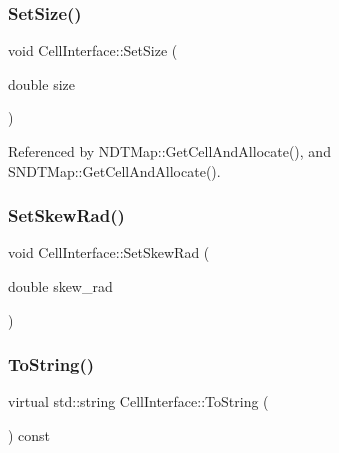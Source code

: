 \mbox{\label{classCellInterface_a100dd6525d41dc526848a5f0e96052d4}} 
\subsubsection{\texorpdfstring{Set\+Size()}{SetSize()}}
{\footnotesize\ttfamily void Cell\+Interface\+::\+Set\+Size (\begin{DoxyParamCaption}\item[{double}]{size }\end{DoxyParamCaption})\hspace{0.3cm}{\ttfamily [inline]}}



Referenced by N\+D\+T\+Map\+::\+Get\+Cell\+And\+Allocate(), and S\+N\+D\+T\+Map\+::\+Get\+Cell\+And\+Allocate().

\mbox{\label{classCellInterface_a2dd7e0d29d71fa86b9abb188a77fdf03}} 
\subsubsection{\texorpdfstring{Set\+Skew\+Rad()}{SetSkewRad()}}
{\footnotesize\ttfamily void Cell\+Interface\+::\+Set\+Skew\+Rad (\begin{DoxyParamCaption}\item[{double}]{skew\+\_\+rad }\end{DoxyParamCaption})\hspace{0.3cm}{\ttfamily [inline]}}

\mbox{\label{classCellInterface_aaf0e64422724ac733741783a4323a4c2}} 
\subsubsection{\texorpdfstring{To\+String()}{ToString()}}
{\footnotesize\ttfamily virtual std\+::string Cell\+Interface\+::\+To\+String (\begin{DoxyParamCaption}{ }\end{DoxyParamCaption}) const\hspace{0.3cm}{\ttfamily [pure virtual]}}




